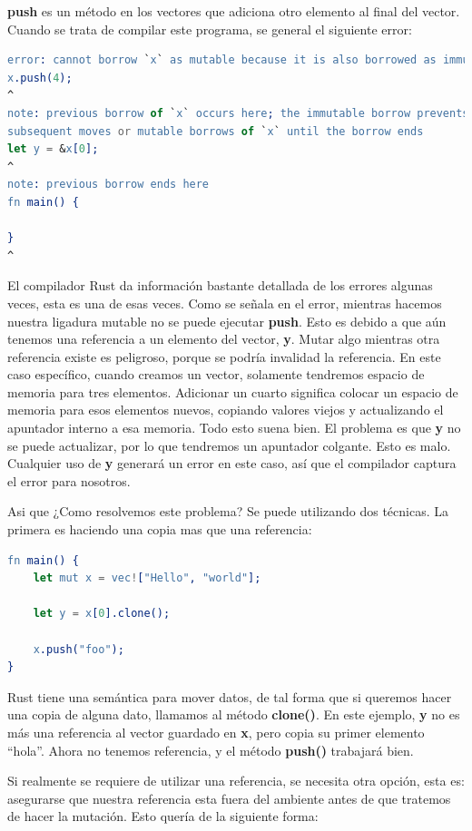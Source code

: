 \documentclass[12pt, twoside]{report}
\begin{document}
\textbf{push} es un método en los vectores que adiciona otro elemento al final del vector. Cuando se trata de compilar este programa, se general el siguiente error:

\begin{lstlisting}[language=erlang]
error: cannot borrow `x` as mutable because it is also borrowed as immutable
x.push(4);
^
note: previous borrow of `x` occurs here; the immutable borrow prevents
subsequent moves or mutable borrows of `x` until the borrow ends
let y = &x[0];
^
note: previous borrow ends here
fn main() {

}
^
\end{lstlisting}

El compilador Rust da información bastante detallada de los errores algunas veces, esta es una de esas veces. Como se señala en el error, mientras hacemos nuestra ligadura mutable no se puede ejecutar  \textbf{push}. Esto es debido a que aún tenemos una referencia a un elemento del vector, \textbf{y}. Mutar algo mientras otra referencia existe es peligroso, porque se podría invalidad la referencia. En este caso específico, cuando creamos un vector, solamente tendremos espacio de memoria para tres elementos. Adicionar un cuarto significa colocar un espacio de memoria para esos elementos nuevos, copiando valores viejos y actualizando el apuntador interno a esa memoria. Todo esto suena bien. El problema es que \textbf{y} no se puede actualizar, por lo que tendremos un apuntador colgante. Esto es malo. Cualquier uso de \textbf{y} generará un error en este caso, así que el compilador captura el error para nosotros.

Asi que ¿Como resolvemos este problema? Se puede utilizando dos técnicas. La primera es haciendo una copia mas que una referencia:


\begin{lstlisting}[language=erlang]
fn main() {
	let mut x = vec!["Hello", "world"];
	
	let y = x[0].clone();
	
	x.push("foo");
}
\end{lstlisting}

Rust tiene una semántica para mover datos, de tal forma que si queremos hacer una copia de alguna dato, llamamos al método \textbf{clone()}. En este ejemplo, \textbf{y} no es más una referencia al vector guardado en \textbf{x\textbf{}}, pero copia su primer elemento ``hola''. Ahora no tenemos referencia, y el método \textbf{push()} trabajará bien.

Si realmente se requiere de utilizar una referencia, se necesita otra opción, esta es: asegurarse que nuestra referencia esta fuera del ambiente antes de que tratemos de hacer la mutación. Esto quería de la siguiente forma:
\end{document}

